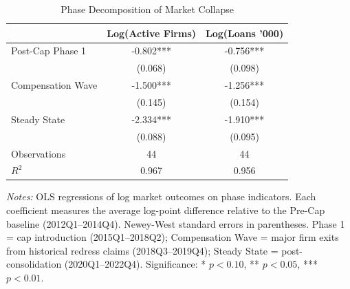 \begin{table}[t]
\centering
\begin{threeparttable}
\caption{Phase Decomposition of Market Collapse}
\label{tab:phases}
\begin{tabular}{lcc}
\toprule
 & Log(Active Firms) & Log(Loans '000) \\
\midrule
Post-Cap Phase 1 & -0.802*** & -0.756*** \\
 & (0.068) & (0.098) \\
Compensation Wave & -1.500*** & -1.256*** \\
 & (0.145) & (0.154) \\
Steady State & -2.334*** & -1.910*** \\
 & (0.088) & (0.095) \\
\midrule
Observations & 44 & 44 \\
$R^2$ & 0.967 & 0.956 \\
\bottomrule
\end{tabular}
\begin{tablenotes}
\item \textit{Notes:} OLS regressions of log market outcomes on phase indicators. Each coefficient measures the average log-point difference relative to the Pre-Cap baseline (2012Q1--2014Q4). Newey-West standard errors in parentheses. Phase 1 = cap introduction (2015Q1--2018Q2); Compensation Wave = major firm exits from historical redress claims (2018Q3--2019Q4); Steady State = post-consolidation (2020Q1--2022Q4). Significance: * $p < 0.10$, ** $p < 0.05$, *** $p < 0.01$.
\end{tablenotes}
\end{threeparttable}
\end{table}
